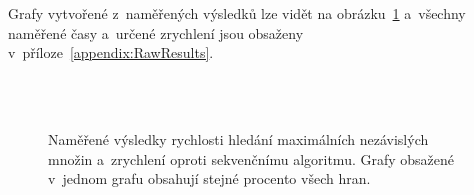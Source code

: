\documentclass[12pt]{article}
\begin{document}
Grafy vytvořené z~naměřených výsledků lze vidět na obrázku~\ref{fig:SpeedResults} a~všechny naměřené časy a~určené zrychlení jsou obsaženy v~příloze~\ref{appendix:RawResults}.

\begin{figure}[p]
    \centering
    \\
    \\
    \caption{Naměřené výsledky rychlosti hledání maximálních nezávislých množin a~zrychlení oproti sekvenčnímu algoritmu. Grafy obsažené v~jednom grafu obsahují stejné procento všech hran.} \label{fig:SpeedResults}
\end{figure}
\end{document}
